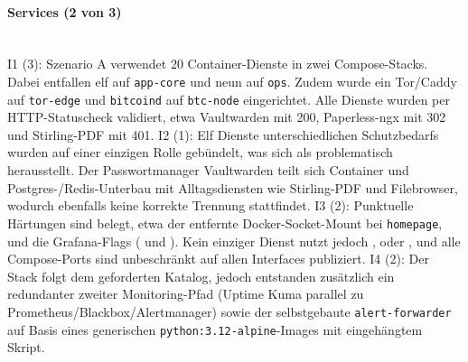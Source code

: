 \paragraph{Services (2 von 3)} \mbox{}\\
I1 (3): Szenario A verwendet 20 Container-Dienste in zwei Compose-Stacks. Dabei entfallen elf auf \texttt{app-core} und neun auf \texttt{ops}. Zudem wurde ein Tor/Caddy auf \texttt{tor-edge} und
\texttt{bitcoind} auf \texttt{btc-node} eingerichtet. Alle Dienste wurden per
\ac{HTTP}-Statuscheck validiert, etwa Vaultwarden mit 200, Paperless-ngx mit 302 und
Stirling-\ac{PDF} mit 401.\cite{runbookA,composeA}
I2 (1): Elf Dienste unterschiedlichen Schutzbedarfs wurden auf einer einzigen
Rolle gebündelt, was sich als problematisch herausstellt. Der Passwortmanager Vaultwarden teilt sich Container und Postgres-/Redis-Unterbau mit Alltagsdiensten wie Stirling-\ac{PDF} und
Filebrowser, wodurch ebenfalls keine korrekte Trennung stattfindet.\cite{composeA,runbookA}
I3 (2): Punktuelle Härtungen sind belegt, etwa der entfernte Docker-Socket-Mount bei \texttt{homepage},  und die Grafana-Flags ( und ).
Kein einziger Dienst nutzt jedoch ,  oder , und alle Compose-Ports sind unbeschränkt auf allen Interfaces publiziert.\cite{composeA,runbookA}
I4 (2): Der Stack folgt dem geforderten Katalog, jedoch entstanden zusätzlich ein redundanter zweiter Monitoring-Pfad (Uptime Kuma parallel zu Prometheus/Blackbox/Alertmanager) sowie der selbstgebaute \texttt{alert-forwarder} auf Basis eines generischen \texttt{python:3.12-alpine}-Images mit eingehängtem Skript.\cite{composeA}

